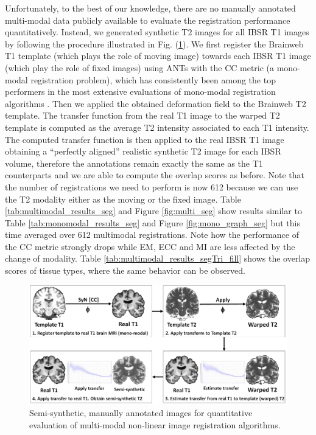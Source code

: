 Unfortunately, to the best of our knowledge, there are no manually annotated multi-modal data publicly available to evaluate the registration performance quantitatively. Instead, we generated synthetic T2 images for all IBSR T1 images by following the procedure illustrated in Fig. (\ref{fig:semi_synthetic_image_creation}). We first register the Brainweb T1 template (which plays the role of moving image) towards each IBSR T1 image (which play the role of fixed images) using ANTs with the CC metric (a mono-modal registration problem), which has consistently been among the top performers in the most extensive evaluations of mono-modal registration algorithms \citep{Klein2009, Klein2010, Rohlfing2012}. Then we applied the obtained deformation field to the Brainweb T2 template. The transfer function from the real T1 image to the warped T2 template is computed as the average T2 intensity associated to each T1 intensity. The computed transfer function is then applied to the real IBSR T1 image obtaining a ``perfectly aligned'' realistic synthetic T2 image for each IBSR volume, therefore the annotations remain exactly the same as the T1 counterparts and we are able to compute the overlap scores as before. Note that the number of registrations we need to perform is now 612 because we can use the T2 modality either as the moving or the fixed image. Table \ref{tab:multimodal_results_seg} and Figure \ref{fig:multi_seg} show results similar to Table \ref{tab:monomodal_results_seg} and Figure \ref{fig:mono_graph_seg} but this time averaged over 612 multimodal registrations. Note how the performance of the CC metric strongly drops while EM, ECC and MI are less affected by the change of modality. Table \ref{tab:multimodal_results_segTri_fill} shows the overlap scores of tissue types, where the same behavior can be observed.\\

\begin{figure}[t!]
\centering
    \includegraphics[width=\linewidth]{./images/semi_synthetic_image_creation.png}
    \caption{Semi-synthetic, manually annotated images for quantitative evaluation of multi-modal non-linear image registration algorithms.}
\label{fig:semi_synthetic_image_creation}
\end{figure}

